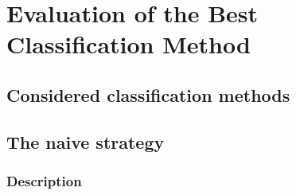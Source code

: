 \chapter{Evaluation of the Best Classification Method}
\label{chap_classification}
\section{Considered classification methods}
\label{sec_considered_classif}
\section{The naive strategy}
\label{sec_naive_strat}
\subsection{Description}
